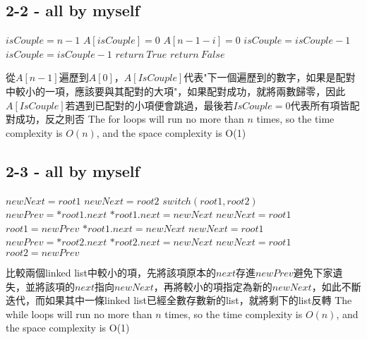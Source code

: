 \documentclass[12pt]{article}
\begin{document}
\subsection*{2-2 - all by myself}
\begin{algorithmic}
    \State $isCouple = n - 1$
    \State $A[isCouple] = 0$
    \State $A[n - 1 - i] = 0$
    \State $isCouple = isCouple-1$
    \State $isCouple = isCouple-1$
    \EndWhile
    \EndIf
    \EndFor
    \State $return\ True$
    \Else
    \State $return\ False$
    \EndIf
    \EndProcedure
\end{algorithmic}
從$A[n-1]$遍歷到$A[0]$，$A[IsCouple]$代表"下一個遍歷到的數字，如果是配對中較小的一項，應該要與其配對的大項"，如果配對成功，就將兩數歸零，因此$A[IsCouple]$若遇到已配對的小項便會跳過，最後若$IsCouple=0$代表所有項皆配對成功，反之則否\newline
The for loops will run no more than $n$ times, so the time complexity is $O(n)$, and the space complexity is O(1)\newpage

\subsection*{2-3 - all by myself}
\begin{algorithmic}
    \State $newNext = root1$
    \Else
    \State $newNext = root2$
    \EndIf
    \State $switch(root1, root2)$
    \EndIf
    \State $newPrev = *root1.next$
    \State $*root1.next = newNext$
    \State $newNext = root1$
    \State $root1 = newPrev$
    \Else
    \State $*root1.next = newNext$
    \State $newNext = root1$
    \State $newPrev = *root2.next$
    \State $*root2.next = newNext$
    \State $newNext = root1$
    \State $root2 = newPrev$
    \EndWhile
    \EndIf
    \EndWhile
    \EndProcedure
\end{algorithmic}
比較兩個linked list中較小的項，先將該項原本的$next$存進$newPrev$避免下家遺失，並將該項的$next$指向$newNext$，再將較小的項指定為新的$newNext$，如此不斷迭代，而如果其中一條linked list已經全數存數新的list，就將剩下的list反轉\newline
The while loops will run no more than $n$ times, so the time complexity is $O(n)$, and the space complexity is O(1)
\end{document}
